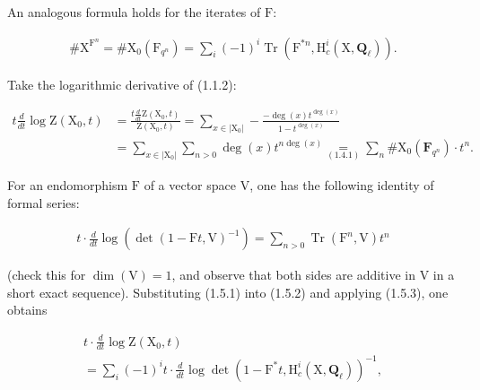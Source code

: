 \documentclass[10pt,leqno]{article}
\begin{document}
\noindent An analogous formula holds for the iterates of \(\mathrm{F}\):\par

\begin{equation*}\begin{gathered}\# \mathrm{X}^{\mathrm{F}^{n}} = \# \mathrm{X}_{0}(\mathrm{F}_{q^{n}}) = \sum _{i} (- 1)^{i} \operatorname{Tr}(\mathrm{F}^{*n},\mathrm{H}_{c}^{i}(\mathrm{X},\mathbf{Q}_{\ell })).\end{gathered}\tag{1.5.1}\end{equation*}

\noindent Take the logarithmic derivative of (1.1.2):\par

\begin{equation*}\begin{aligned}
t\frac{d}{dt}\log\mathrm Z(\mathrm X_0,t)&=\frac{t\frac{d}{dt}\mathrm Z(\mathrm X_0,t)}{\mathrm Z(\mathrm X_0,t)}
=\sum_{x\in|\mathrm X_0|}-\frac{-\deg(x)t^{\deg(x)}}{1-t^{\deg(x)}}\\
&=\sum_{x\in|\mathrm X_0|}\sum_{n>0}\deg(x)t^{n\deg(x)}
\underset{(1.4.1)}{=}\sum_n\#\mathrm X_0(\mathbf F_{q^n})\cdot t^n.
\end{aligned}\tag{1.5.2}\end{equation*}

\noindent For an endomorphism \(\mathrm{F}\) of a vector space \(\mathrm{V}\), one has the following identity of formal series:\par

\begin{equation*}\begin{gathered}t\cdot \frac{d}{dt} \operatorname{log}(\operatorname{det}(1- \mathrm{F}t,\mathrm{V})^{- 1}) = \sum _{n>0} \operatorname{Tr}(\mathrm{F}^{n},\mathrm{V})t^{n}\end{gathered}\tag{1.5.3}\end{equation*}

\clearpage

\label{physical-5}\par\smallskip

\noindent (check this for \(\operatorname{dim}(\mathrm{V})=1\), and observe that both sides are additive in \(\mathrm{V}\) in a short exact sequence). Substituting (1.5.1) into (1.5.2) and applying (1.5.3), one obtains\par

\begin{equation*}\begin{gathered}t\cdot \frac{d}{dt} \operatorname{log} \mathrm{Z}(\mathrm{X}_{0},t) \\ = \sum _{i} (- 1)^{i} t\cdot \frac{d}{dt} \operatorname{log} \operatorname{det}(1- \mathrm{F}^{*}t,\mathrm{H}_{c}^{i}(\mathrm{X},\mathbf{Q}_{\ell }))^{- 1},\end{gathered}\end{equation*}
\end{document}
